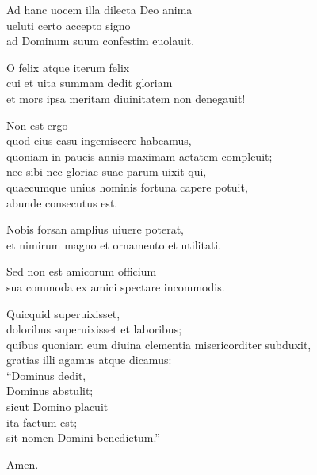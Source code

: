 \documentclass[a5paper,twoside]{article}
\begin{document}
Ad hanc uocem illa dilecta Deo anima \\
ueluti certo accepto signo \\
ad Dominum suum confestim euolauit.

O felix atque iterum felix \\
cui et uita summam dedit gloriam \\
et mors ipsa meritam diuinitatem non denegauit!  

Non est ergo \\
quod eius casu ingemiscere habeamus, \\
quoniam in paucis annis maximam aetatem compleuit; \\
nec sibi nec gloriae suae parum uixit qui, \\
quaecumque unius hominis fortuna capere potuit, \\
abunde consecutus est.  

Nobis forsan amplius uiuere poterat, \\
et nimirum magno et ornamento et utilitati.  

Sed non est amicorum officium \\
sua commoda ex amici spectare incommodis.  

Quicquid superuixisset, \\
doloribus superuixisset et laboribus; \\
quibus quoniam eum diuina clementia misericorditer subduxit, \\
gratias illi agamus atque dicamus: \\
``Dominus dedit, \\
Dominus abstulit; \\
sicut Domino placuit \\
ita factum est; \\
sit nomen Domini benedictum.'' 

Amen.


\endnumbering
\end{document}
